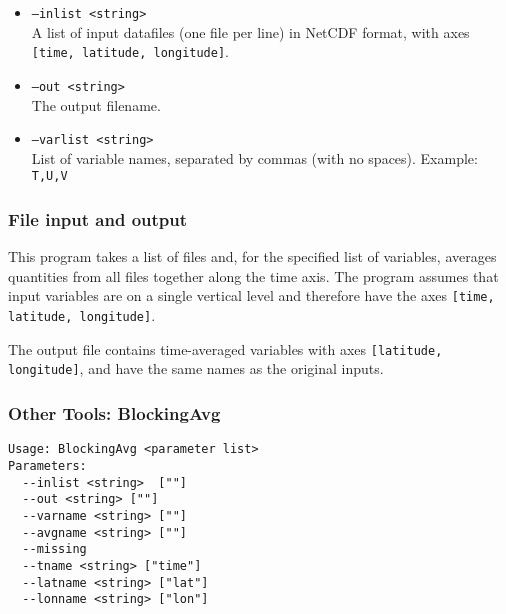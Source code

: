 \documentclass{article}
\begin{document}
\begin{itemize}
\item[]\texttt{--inlist <string>} \\ A list of input datafiles (one file per line) in NetCDF format, with axes \texttt{[time, latitude, longitude]}. 
\item[] \texttt{--out <string>}\\ The output filename.
\item[] \texttt{--varlist <string>}\\ List of variable names, separated by commas (with no spaces). Example: \texttt{T,U,V}
\end{itemize}

\subsubsection{File input and output}
This program takes a list of files and, for the specified list of variables, averages quantities from all files together along the time axis. The program assumes that input variables are on a single vertical level and therefore have the axes \texttt{[time, latitude, longitude]}. 

The output file contains time-averaged variables  with axes \texttt{[latitude, longitude]}, and have the same names as the original inputs. 




\subsubsection{Other Tools: BlockingAvg}\label{bavg}
\begin{verbatim}
Usage: BlockingAvg <parameter list>
Parameters:
  --inlist <string>  [""]
  --out <string> [""]
  --varname <string> [""]
  --avgname <string> [""]
  --missing
  --tname <string> ["time"]
  --latname <string> ["lat"]
  --lonname <string> ["lon"]
\end{verbatim}
\end{document}
